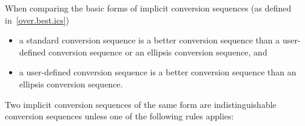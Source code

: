 \pnum
When comparing the basic forms of implicit conversion sequences
(as defined in~\ref{over.best.ics})

\begin{itemize}
\item
a standard conversion sequence is a better
conversion sequence than a user-defined conversion sequence
or an ellipsis conversion sequence, and
\item
a user-defined conversion sequence is a
better conversion sequence than an ellipsis conversion
sequence.
\end{itemize}

\pnum
Two implicit conversion sequences of the same form are
indistinguishable conversion sequences unless one of the
following rules applies:

